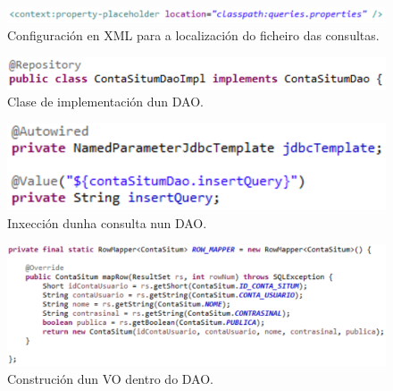 \begin{figure}[tbh] 
	\begin{center}
		\includegraphics[width=1\textwidth]{figures/codigo/placeholderConsultas}
		\caption{Configuración en XML para a localización do ficheiro das consultas.}
		\label{fig:placeholderConsultas}
	\end{center}
\end{figure}

\begin{figure}[tbh] 
	\begin{center}
		\includegraphics[width=1\textwidth]{figures/codigo/dao}
		\caption{Clase de implementación dun DAO.}
		\label{fig:dao}
	\end{center}
\end{figure}

\begin{figure}[tbh] 
	\begin{center}
		\includegraphics[width=1\textwidth]{figures/codigo/inxeccionDao}
		\caption{Inxección dunha consulta nun DAO.}
		\label{fig:inxeccionDao}
	\end{center}
\end{figure}

\begin{figure}[tbh] 
	\begin{center}
		\includegraphics[width=1\textwidth]{figures/codigo/daoRowMapper}
		\caption{Construción dun VO dentro do DAO.}
		\label{fig:daoRowMapper}
	\end{center}
\end{figure}

